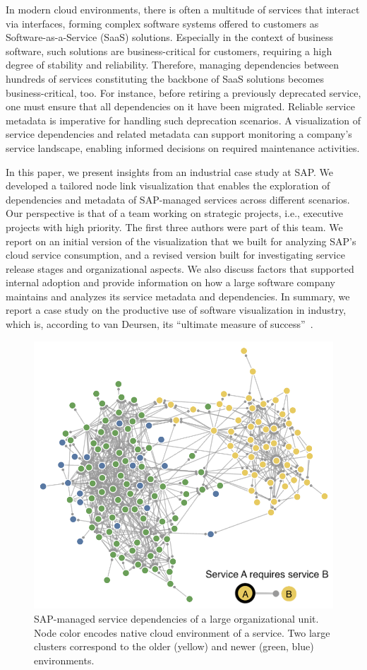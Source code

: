 \documentclass[conference]{IEEEtran}
\begin{document}
In modern cloud environments, there is often a multitude of services that interact via interfaces, forming complex software systems offered to customers as Software-as-a-Service (SaaS) solutions.
Especially in the context of business software, such solutions are business-critical for customers, requiring a high degree of stability and reliability.
Therefore, managing dependencies between hundreds of services constituting the backbone of SaaS solutions becomes business-critical, too.
For instance, before retiring a previously deprecated service, one must ensure that all dependencies on it have been migrated.
Reliable service metadata is imperative for handling such deprecation scenarios.
A visualization of service dependencies and related metadata can support monitoring a company's service landscape, enabling informed decisions on required maintenance activities.

In this paper, we present insights from an industrial case study at SAP.
We developed a tailored node link visualization that enables the exploration of dependencies and metadata of SAP-managed services across different scenarios.
Our perspective is that of a team working on strategic projects, i.e., executive projects with high priority. The first three authors were part of this team.
We report on an initial version of the visualization that we built for analyzing SAP's cloud service consumption, and a revised version built for investigating service release stages and organizational aspects.
We also discuss factors that supported internal adoption and provide information on how a large software company maintains and analyzes its service metadata and dependencies.
In summary, we report a case study on the productive use of software visualization in industry, which is, according to van Deursen, its ``ultimate measure of success''~\cite{DBLP:conf/softvis/Deursen10}.

\begin{figure}
    \centering
    \includegraphics[width=0.79\linewidth,trim=0 5pt 0 0,clip]{figures/direct-dependencies-fp-clean.png}
    \caption{SAP-managed service dependencies of a large organizational unit. Node color encodes native cloud environment of a service. Two large clusters correspond to the older (yellow) and newer (green, blue) environments.}
    \label{fig:all-services}
\end{figure}
\end{document}
